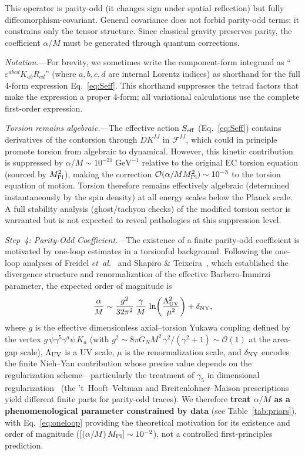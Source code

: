 \documentclass[aps,prd,twocolumn,superscriptaddress,showpacs,preprintnumbers,nofootinbib,longbibliography,floatfix]{revtex4-2}
\newcommand{\MPl}{M_{\rm Pl}}
\newcommand{\etal}{\textit{et~al.}}
\begin{document}
This operator is parity-odd (it changes sign under spatial reflection) but fully diffeomorphism-covariant. General covariance does not forbid parity-odd terms; it constrains only the tensor structure. Since classical gravity preserves parity, the coefficient $\alpha/M$ must be generated through quantum corrections.

\textit{Notation.}---For brevity, we sometimes write the component-form integrand as ``$\varepsilon^{abcd}K_{ab}R_{cd}$'' (where $a,b,c,d$ are internal Lorentz indices) as shorthand for the full 4-form expression Eq.~\eqref{eq:Seff}. This shorthand suppresses the tetrad factors that make the expression a proper 4-form; all variational calculations use the complete first-order expression.

\textit{Torsion remains algebraic.}---The effective action $S_{\rm eff}$ (Eq.~\ref{eq:Seff}) contains derivatives of the contorsion through $\mathring{D}K^{IJ}$ in $\mathcal{F}^{IJ}$, which could in principle promote torsion from algebraic to dynamical. However, this kinetic contribution is suppressed by $\alpha/M\sim 10^{-21}\;\text{GeV}^{-1}$ relative to the original EC torsion equation (sourced by $\MPl^2$), making the correction $\mathcal{O}(\alpha/M\MPl^2)\sim 10^{-3}$ to the torsion equation of motion. Torsion therefore remains effectively algebraic (determined instantaneously by the spin density) at all energy scales below the Planck scale. A full stability analysis (ghost/tachyon checks) of the modified torsion sector is warranted but is not expected to reveal pathologies at this suppression level.

\textit{Step~4: Parity-Odd Coefficient.}---The existence of a finite parity-odd coefficient is motivated by one-loop estimates in a torsionful background. Following the one-loop analyses of Freidel \etal~\cite{Freidel2005} and Shapiro \& Teixeira~\cite{ShapiroTeixeira2014}, which established the divergence structure and renormalization of the effective Barbero-Immirzi parameter, the expected order of magnitude is
\begin{equation}\label{eq:oneloop}
\frac{\alpha}{M}\sim \frac{g^2}{32\pi^2}\,\frac{\gamma}{M}\,\ln\!\left(\frac{\Lambda_{\rm UV}^2}{\mu^2}\right)+\delta_{\rm NY},
\end{equation}
where $g$ is the effective dimensionless axial--torsion Yukawa coupling defined by the vertex $g\,\bar{\psi}\gamma^5\gamma^a\psi\,K_a$ (with $g^2\sim 8\pi G_N M^2\,\gamma^2/(\gamma^2+1)\sim\mathcal{O}(1)$ at the area-gap scale), $\Lambda_{\rm UV}$ is a UV scale, $\mu$ is the renormalization scale, and $\delta_{\rm NY}$ encodes the finite Nieh--Yan contribution whose precise value depends on the regularization scheme---particularly the treatment of $\gamma_5$ in dimensional regularization~\cite{ShapiroTeixeira2014} (the 't~Hooft--Veltman and Breitenlohner--Maison prescriptions yield different finite parts for parity-odd traces). We therefore \textbf{treat $\alpha/M$ as a phenomenological parameter constrained by data} (see Table~\ref{tab:priors}), with Eq.~\eqref{eq:oneloop} providing the theoretical motivation for its existence and order of magnitude ($[(\alpha/M)\,\MPl]\sim 10^{-2}$), not a controlled first-principles prediction.
\end{document}
